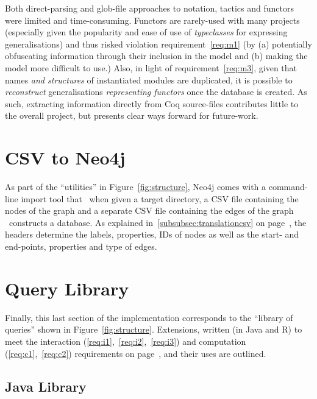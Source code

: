 Both direct-parsing and glob-file approaches to notation, tactics and functors
were limited and time-consuming. Functors are rarely-used with many projects
(especially given the popularity and ease of use of \emph{typeclasses} for
expressing generalisations) and thus risked violation requirement~\ref{req:m1}
(by (a) potentially obfuscating information through their inclusion in the model
and (b) making the model more difficult to use.) Also, in light of
requirement~\ref{req:m3}, given that names \emph{and structures} of instantiated
modules are duplicated, it is possible to \emph{reconstruct} generalisations
\emph{representing functors} once the database is created. As such, extracting
information directly from Coq source-files contributes little to the overall
project, but presents clear ways forward for future-work.

\section{CSV to Neo4j}

As part of the ``utilities'' in Figure~\ref{fig:structure}, Neo4j comes
with a command-line import tool that \textendash~when given a target directory,
a CSV file containing the nodes of the graph and a separate CSV file containing
the edges of the graph \textendash~constructs a database.  As explained
in~\ref{subsubsec:translationcsv} on page~\pageref{subsubsec:translationcsv},
the headers determine the labels, properties, IDs of nodes as well as the start-
and end-points, properties and type of edges.


\section{Query Library}

Finally, this last section of the implementation corresponds to the ``library of
queries'' shown in Figure~\ref{fig:structure}. Extensions, written (in Java and
R) to meet the interaction (\ref{req:i1},~\ref{req:i2},~\ref{req:i3}) and
computation (\ref{req:c1},~\ref{req:c2}) requirements on page~\pageref{req:i1},
and their uses are outlined.

\subsection{Java Library}

